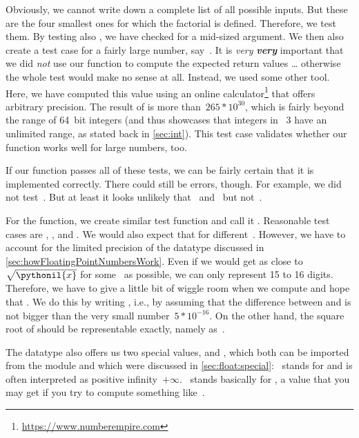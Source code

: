 Obviously, we cannot write down a complete list of all possible inputs.
But these are the four smallest ones for which the factorial is defined.
Therefore, we test them.
By testing also , we have checked  for a mid-sized argument.
We then also create a test case for a fairly large number, say~.
It is \emph{very} \emph{\textbf{very}} important that we did \emph{not} use our  function to compute the expected return values {\dots} otherwise the whole test would make no sense at all.
Instead, we used some other tool.
Here, we have computed this value using an online calculator\footnote{\url{https://www.numberempire.com}} that offers arbitrary precision.
The result of  is more than~$265*10^{30}$, which is fairly beyond the range of 64~bit integers (and thus showcases that integers in \python~3 have an unlimited range, as stated back in \cref{sec:int}).
This test case validates whether our  function works well for large numbers, too.

If our  function passes all of these tests, we can be fairly certain that it is implemented correctly.
There could still be errors, though.
For example, we did not test~.
But at least it looks unlikely that~ and~  but not~.

For the  function, we create similar test function and call it .
Reasonable test cases are , , and .
We would also expect that  for different~.
However, we have to account for the limited precision of the datatype  discussed in \cref{sec:howFloatingPointNumbersWork}.
Even if we would get as close to~$\sqrt{\pythonil{x}}$ for some~ as possible, we can only represent 15 to 16 digits.
Therefore, we have to give a little bit of wiggle room when we compute  and hope that .
We do this by writing , i.e., by assuming that the difference between  and  is not bigger than the very small number~$5*10^{-16}$.
On the other hand, the square root of  should be representable exactly, namely as~.

The datatype  also offers us two special values,  and , which both can be imported from the  module and which were discussed in \cref{sec:float:special}:
~stands for  and is often interpreted as positive infinity~$+\infty$.
~stands basically for , a value that you may get if you try to compute something like~.

